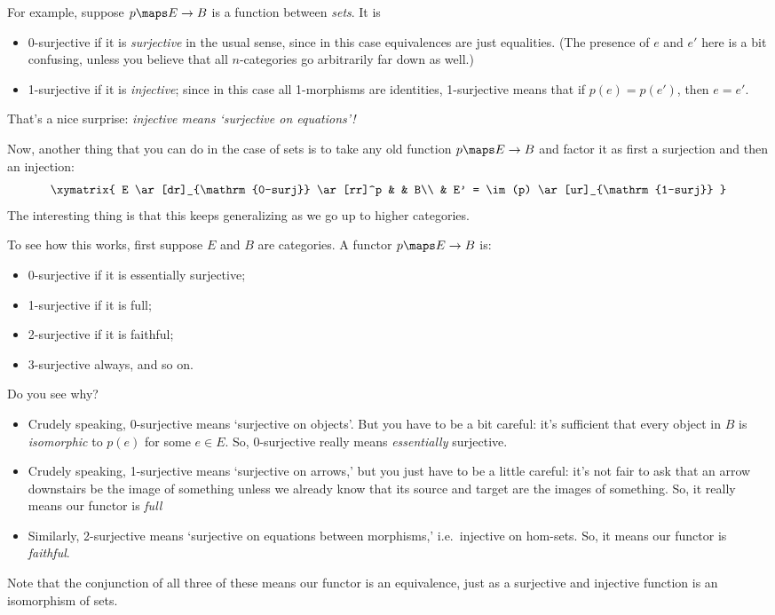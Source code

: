 \documentclass{amsart}
\begin{document}
For example, suppose $p\maps E\to B$ is a function between \emph{sets}.  It
is
\begin{itemize}
\item 0-surjective if it is \emph{surjective} in the usual sense, since in
  this case equivalences are just equalities.  (The presence of $e$
  and $e'$ here is a bit confusing, unless you believe that all
  $n$-categories go arbitrarily far down as well.)
\item 1-surjective if it is \emph{injective}; since in this case all
  1-morphisms are identities, 1-surjective means that if $p(e)=p(e')$,
  then $e=e'$.
\end{itemize}

That's a nice surprise: \emph{injective means `surjective on
equations'!}  

Now, another thing that you can do in the case of sets is to take any
old function $p\maps E\to B$ and factor it as first a surjection and then
an injection:
\[\xymatrix{
  E \ar[dr]_{\mathrm{0-surj}} \ar[rr]^p & & B\\
  & E' = \im(p) \ar[ur]_{\mathrm{1-surj}}
}\]
The interesting thing is that this keeps generalizing as we go up to
higher categories.

To see how this works, first suppose $E$ and $B$ are categories.  
A functor $p\maps E\to B$ is:
\begin{itemize}
\item 0-surjective if it is essentially surjective;
\item 1-surjective if it is full;
\item 2-surjective if it is faithful;
\item 3-surjective always, and so on.
\end{itemize}

Do you see why?
\begin{itemize}
\item
Crudely speaking, 0-surjective means `surjective on objects'.  But
you have to be a bit careful: it's sufficient that every object in 
$B$ is \emph{isomorphic} to $p(e)$ for some $e \in E$.  So,
0-surjective really means \emph{essentially} surjective.
\item
Crudely speaking,
1-surjective means `surjective on arrows,' but you just have to be a
little careful: it's not fair to ask that an arrow downstairs be the
image of something unless we already know that its source and target
are the images of something.  So, it really means our functor
is \emph{full}
\item
Similarly, 2-surjective means `surjective on equations
between morphisms,' i.e.\ injective on hom-sets.  So, it means
our functor is \emph{faithful}.  
\end{itemize}
Note that the conjunction of all three of these means our functor
is an equivalence, just as a surjective and injective function is
an isomorphism of sets.
\end{document}
